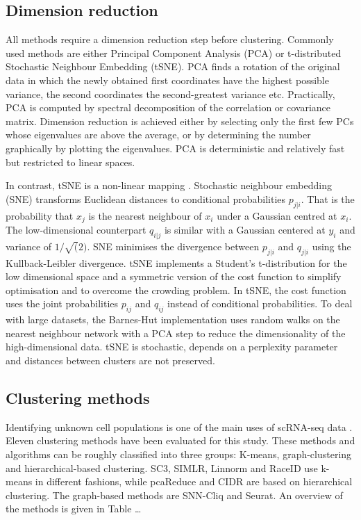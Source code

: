 \documentclass[12pt, a4paper]{article}\usepackage[]{graphicx}\usepackage[]{color}
\begin{document}
\subsection{Dimension reduction}
All methods require a dimension reduction step before clustering. Commonly used methods are either Principal Component Analysis (PCA) or t-distributed Stochastic Neighbour Embedding (tSNE). PCA finds a rotation of the original data in which the newly obtained first coordinates have the highest possible variance, the second coordinates the second-greatest variance etc. Practically, PCA is computed by spectral decomposition of the correlation or covariance matrix. Dimension reduction is achieved either by selecting only the first few PCs whose eigenvalues are above the average, or by determining the number graphically by plotting the eigenvalues. PCA is deterministic and relatively fast but restricted to linear spaces.

In contrast,  tSNE is a non-linear mapping \citep{van2013barnes}. Stochastic neighbour embedding (SNE) transforms Euclidean distances to conditional probabilities $p_{j|i}$. That is the probability that \(x_j\) is the nearest neighbour of $x_i$ under a Gaussian centred at $x_i$. The low-dimensional counterpart $q_{i|j}$ is similar with a Gaussian centered at $y_i$ and variance of $1/\sqrt(2)$. SNE minimises the divergence between $p_{j|i}$ and $q_{j|i}$ using the Kullback-Leibler divergence. tSNE implements a Student's t-distribution for the low dimensional space and a symmetric version of the cost function to simplify optimisation and to overcome the crowding problem. In tSNE, the cost function uses the joint probabilities $p_{ij}$ and $q_{ij}$ instead of conditional probabilities. To deal with large datasets, the Barnes-Hut implementation uses random walks on the nearest neighbour network with a PCA step to reduce the dimensionality of the high-dimensional data. tSNE is stochastic, depends on a perplexity parameter and distances between clusters are not preserved. 
\subsection{Clustering methods}
Identifying unknown cell populations is one of the main uses of scRNA-seq data \citep{andrews2017identifying}. Eleven clustering methods have been evaluated for this study. These methods and algorithms can be roughly classified into three groups: K-means, graph-clustering and hierarchical-based clustering. 
SC3, SIMLR, Linnorm and RaceID use k-means in different fashions, while pcaReduce and CIDR are based on hierarchical clustering. The graph-based methods are SNN-Cliq and Seurat. An overview of the methods is given in Table \dots
\end{document}
